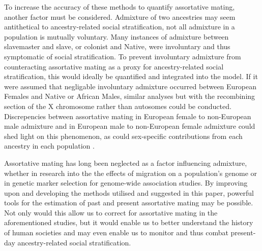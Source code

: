 \documentclass[11pt]{article}
\begin{document}
To increase the accuracy of these methods to quantify assortative mating, another factor must be considered. Admixture of two ancestries may seem antithetical to ancestry-related social stratification, not all admixture in a population is mutually voluntary. Many instances of admixture between slavemaster and slave, or colonist and Native, were involuntary and thus symptomatic of social stratification. To prevent involuntary admixture from counteracting assortative mating as a proxy for ancestry-related social stratification, this would ideally be quantified and integrated into the model. If it were assumed that negligable involuntary admixture occurred between European Females and Native or African Males, similar analyses but with the recombining section of the X chromosome rather than autosomes could be conducted. Discrepencies between assortative mating in European female to non-European male admixture and in European male to non-European female admixture could shed light on this phenomenon, as could sex-specific contributions from each ancestry in each population \parencite{Micheletti2020}.

Assortative mating has long been neglected as a factor influencing admixture, whether in research into the the effects of migration on a population's genome or in genetic marker selection for genome-wide association studies. By improving upon and developing the methods utilised and suggested in this paper, powerful tools for the estimation of past and present assortative mating may be possible. Not only would this allow us to correct for assortative mating in the aforementioned studies, but it would enable us to better understand the history of human societies and may even enable us to monitor and thus combat present-day ancestry-related social stratification.

































\end{document}
